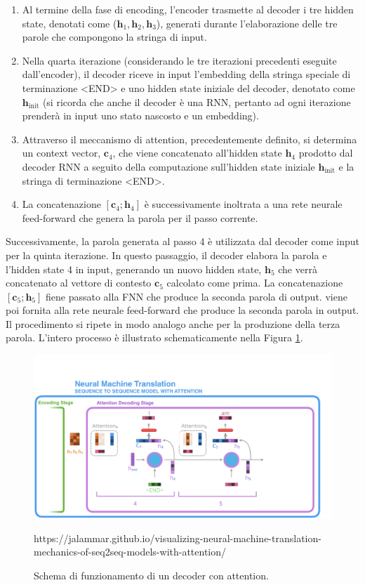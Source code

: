 \documentclass[12pt,a4paper,twoside,openright]{book}
\begin{document}
\begin{enumerate}
    \item Al termine della fase di encoding, l'encoder trasmette al decoder i tre hidden state, denotati come ($\mathbf{h}_1, \mathbf{h}_2, \mathbf{h}_3$), generati durante l'elaborazione delle tre parole che compongono la stringa di input.
    \item Nella quarta iterazione (considerando le tre iterazioni precedenti eseguite dall'encoder), il decoder riceve in input l'embedding della stringa speciale di terminazione <END> e uno hidden state iniziale del decoder, denotato come $\mathbf{h}_{\text{init}}$ (si ricorda che anche il decoder è una RNN, pertanto ad ogni iterazione prenderà in input uno stato nascosto e un embedding). 
    \item Attraverso il meccanismo di attention, precedentemente definito, si determina un context vector, $\mathbf{c}_4$, che viene concatenato all'hidden state $\mathbf{h}_4$ prodotto dal decoder RNN a seguito della computazione sull'hidden state iniziale $\mathbf{h}_{\text{init}}$ e la stringa di terminazione <END>. 
    \item La concatenazione $[\mathbf{c}_4 ; \mathbf{h}_4]$ è successivamente inoltrata a una rete neurale feed-forward che genera la parola per il passo corrente. 
\end{enumerate}

Successivamente, la parola generata al passo 4 è utilizzata dal decoder come input per la quinta iterazione. In questo passaggio, il decoder elabora la parola e l'hidden state 4 in input, generando un nuovo hidden state, $\mathbf{h}_5$ che verrà concatenato al vettore di contesto $\mathbf{c}_5$ calcolato come prima. La concatenazione $[\mathbf{c}_5 ; \mathbf{h}_5]$ fiene passato alla FNN che produce la seconda parola di output. 
viene poi fornita alla rete neurale feed-forward che produce la seconda parola in output. Il procedimento si ripete in modo analogo anche per la produzione della terza parola. L'intero processo è illustrato schematicamente nella Figura \ref{fig:attention_dance}.

\begin{figure}
    \centering
    \includegraphics[width=\textwidth]{images/attention_schema.png}
    \caption{Schema di funzionamento di un decoder con attention.}
    \label{fig:attention_dance}
    \tiny{https://jalammar.github.io/visualizing-neural-machine-translation-mechanics-of-seq2seq-models-with-attention/}
\end{figure}
\end{document}
